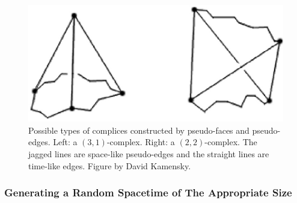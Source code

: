 \message{ !name(programmers_guide.tex)}\documentclass[12pt]{article}
\begin{document}
\begin{figure}[htb]
  \centering
  \includegraphics[width=\textwidth]{pseudo-face_complices.png}
  \caption{Possible types of complices constructed by pseudo-faces and
    pseudo-edges. Left: a $(3,1)$-complex. Right: a
    $(2,2)$-complex. The jagged lines are space-like pseudo-edges and
    the straight lines are time-like edges. Figure by David Kamensky.}
  \label{fig:pseudo-face-complices}
\end{figure}

\subsubsection{Generating a Random Spacetime of The Appropriate Size}
\label{sec:grow-spacetime}
\end{document}
